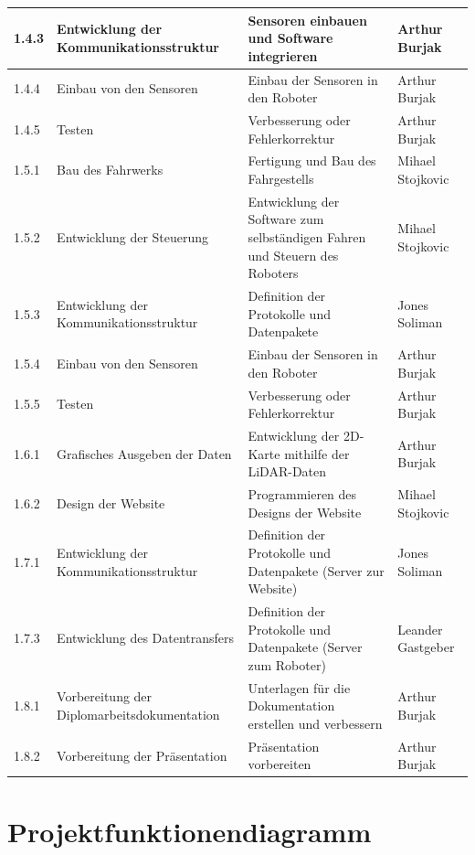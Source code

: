 \begin{longtable}[c]{|p{1cm}|p{5cm}|p{5cm}|l|}
\hline
1.4.3 & Entwicklung der Kommunikationsstruktur & Sensoren einbauen und Software integrieren & Arthur Burjak \\
\hline
1.4.4 & Einbau von den Sensoren & Einbau der Sensoren in den Roboter & Arthur Burjak \\
\hline
1.4.5 & Testen & Verbesserung oder Fehlerkorrektur & Arthur Burjak \\
\hline
1.5.1 & Bau des Fahrwerks & Fertigung und Bau des Fahrgestells & Mihael Stojkovic \\
\hline
1.5.2 & Entwicklung der Steuerung & Entwicklung der Software zum selbständigen Fahren und Steuern des Roboters & Mihael Stojkovic \\
\hline
1.5.3 & Entwicklung der Kommunikationsstruktur & Definition der Protokolle und Datenpakete & Jones Soliman \\
\hline
1.5.4 & Einbau von den Sensoren & Einbau der Sensoren in den Roboter & Arthur Burjak \\
\hline
1.5.5 & Testen & Verbesserung oder Fehlerkorrektur & Arthur Burjak \\
\hline
1.6.1 & Grafisches Ausgeben der Daten & Entwicklung der 2D-Karte mithilfe der LiDAR-Daten & Arthur Burjak \\
\hline
1.6.2 & Design der Website & Programmieren des Designs der Website & Mihael Stojkovic \\
\hline
1.7.1 & Entwicklung der Kommunikationsstruktur & Definition der Protokolle und Datenpakete (Server zur Website) & Jones Soliman \\
\hline
1.7.3 & Entwicklung des Datentransfers & Definition der Protokolle und Datenpakete (Server zum Roboter) & Leander Gastgeber \\
\hline
1.8.1 & Vorbereitung der Diplomarbeitsdokumentation & Unterlagen für die Dokumentation erstellen und verbessern & Arthur Burjak \\
\hline
1.8.2 & Vorbereitung der Präsentation & Präsentation vorbereiten & Arthur Burjak \\
\hline
\end{longtable}


\newpage

\section{Projektfunktionendiagramm}

